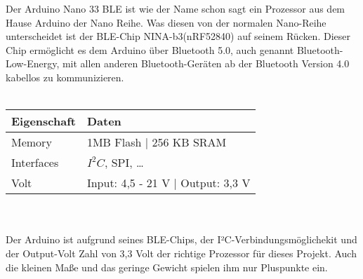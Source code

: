 Der Arduino Nano 33 BLE ist wie der Name schon sagt ein Prozessor aus dem Hause Arduino
der Nano Reihe. Was diesen von der normalen Nano-Reihe unterscheidet ist der BLE-Chip
NINA-b3(nRF52840) auf seinem Rücken. Dieser Chip ermöglicht es dem Arduino über 
Bluetooth 5.0, auch genannt Bluetooth-Low-Energy, mit allen anderen Bluetooth-Geräten ab 
der Bluetooth Version 4.0 kabellos zu kommunizieren.\\
\\
\begin{tabularx}{0.8\textwidth}{l|X}
Eigenschaft & Daten \\
\hline
Memory & 1MB Flash | 256 KB SRAM \\ 

Interfaces & $I^2C$, SPI, \dots \\

Volt & Input: 4,5 - 21 V | Output: 3,3 V\\
\end{tabularx}
\\
\\
Der Arduino ist aufgrund seines BLE-Chips, der I²C-Verbindungsmöglichekit und der 
Output-Volt Zahl von 3,3 Volt der richtige Prozessor für dieses Projekt. Auch die 
kleinen Maße und das geringe Gewicht spielen ihm nur Pluspunkte ein.